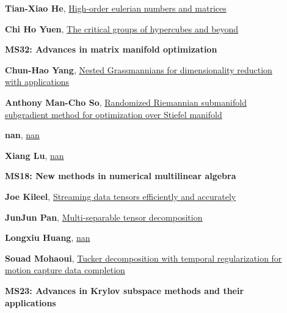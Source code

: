 \documentclass[ILAS2025-program.tex]{subfiles}
\begin{document}
\begin{description}
\begin{description}
        \item[] \hypertarget{up0183}{}\textbf{Tian-Xiao He}, \hyperlink{down0183}{High-order eulerian numbers and matrices}
        \item[] \hypertarget{up0184}{}\textbf{Chi Ho Yuen}, \hyperlink{down0184}{The critical groups of hypercubes and beyond}
        \end{description}
    \begin{description}
    \item[] {\color{mstitle}\textbf{MS32: Advances in matrix manifold optimization}} 
    \item[] \hypertarget{up0185}{}\textbf{Chun-Hao Yang}, \hyperlink{down0185}{Nested Grassmannians for dimensionality reduction with applications}
        \item[] \hypertarget{up0186}{}\textbf{Anthony Man-Cho So}, \hyperlink{down0186}{Randomized Riemannian submanifold subgradient method for optimization over Stiefel manifold}
        \item[] \hypertarget{up0187}{}\textbf{nan}, \hyperlink{down0187}{nan}
        \item[] \hypertarget{up0188}{}\textbf{Xiang Lu}, \hyperlink{down0188}{nan}
        \end{description}
    \begin{description}
    \item[] {\color{mstitle}\textbf{MS18: New methods in numerical multilinear algebra}} 
    \item[] \hypertarget{up0189}{}\textbf{Joe Kileel}, \hyperlink{down0189}{Streaming data tensors efficiently and accurately
}
        \item[] \hypertarget{up0190}{}\textbf{JunJun Pan}, \hyperlink{down0190}{Multi-separable tensor decomposition}
        \item[] \hypertarget{up0191}{}\textbf{Longxiu Huang}, \hyperlink{down0191}{nan}
        \item[] \hypertarget{up0192}{}\textbf{Souad Mohaoui}, \hyperlink{down0192}{Tucker decomposition with temporal regularization for motion capture data completion}
        \end{description}
    \begin{description}
    \item[] {\color{mstitle}\textbf{MS23: Advances in Krylov subspace methods and their applications}} 

\end{description}
\end{description}
\end{document}
